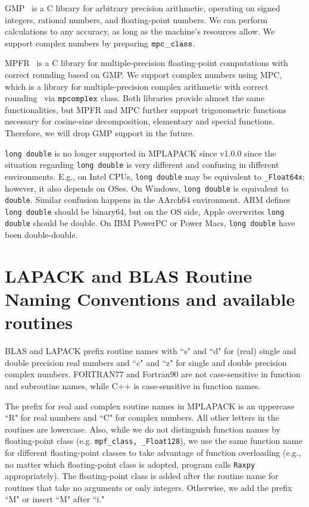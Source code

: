 \documentclass[12pt]{article}
\begin{document}
GMP~\cite{Granlund12} is a C library for arbitrary precision arithmetic, operating on signed integers, rational numbers, and floating-point numbers. We can perform calculations to any accuracy, as long as the machine's resources allow. We support complex numbers by preparing ${\tt mpc\_class}$. 

MPFR~\cite{10.1145/1236463.1236468} is a C library for multiple-precision floating-point computations with correct rounding based on GMP. We support complex numbers using MPC, which is a library for multiple-precision complex arithmetic with correct rounding~\cite{MPC} via ${\tt mpcomplex}$ class. Both libraries provide almost the same functionalities, but MPFR and MPC further support trigonometric functions necessary for cosine-sine decomposition, elementary and special functions. Therefore, we will drop GMP support in the future.

{\tt long double} is no longer supported in MPLAPACK since v1.0.0 since the situation regarding {\tt long double} is very different and confusing in different environments. E.g., on Intel CPUs, {\tt long double} may be equivalent to {\tt \_Float64x}; however, it also depends on OSes. On Windows, {\tt long double} is equivalent to {\tt double}. Similar confusion happens in the AArch64 environment. ARM defines {\tt long double} should be binary64, but on the OS side, Apple overwrites {\tt long double} should be double. On IBM PowerPC or Power Macs, {\tt long double} have been double-double.

\section{LAPACK and BLAS Routine Naming Conventions and available routines}
\label{sec:nameconventions}
BLAS and LAPACK prefix routine names with ``s" and ``d" for (real) single and double precision real numbers and ``c" and ``z" for single and double precision complex numbers. FORTRAN77 and Fortran90 are not case-sensitive in function and subroutine names, while C++ is case-sensitive in function names.

The prefix for real and complex routine names in MPLAPACK is an uppercase ``R" for real numbers and ``C" for complex numbers. All other letters in the routines are lowercase.
Also, while we do not distinguish function names by floating-point class (e.g. {\tt mpf\_class, \_Float128}), we use the same function name for different floating-point classes to take advantage of function overloading (e.g., no matter which floating-point class is adopted, program calls {\tt Raxpy} appropriately). The floating-point class is added after the routine name for routines that take no arguments or only integers. Otherwise, we add the prefix ``M" or insert ``M" after ``i."
\end{document}
